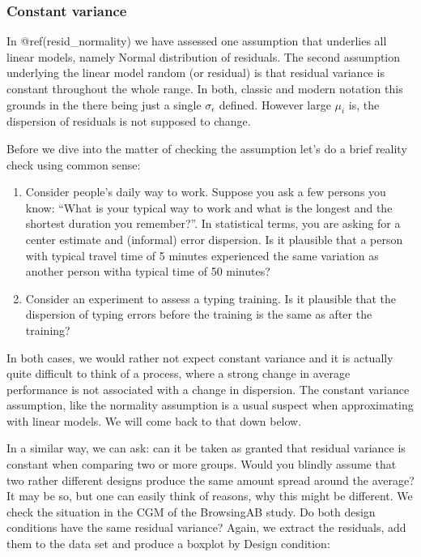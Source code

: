 \documentclass[]{svmono}
\theoremstyle{definition}
\theoremstyle{definition}
\theoremstyle{definition}
\theoremstyle{remark}
\begin{document}
\subsubsection{Constant variance}\label{resid_constant_variance}

In @ref(resid\_normality) we have assessed one assumption that underlies
all linear models, namely Normal distribution of residuals. The second
assumption underlying the linear model random (or residual) is that
residual variance is constant throughout the whole range. In both,
classic and modern notation this grounds in the there being just a
single \(\sigma_\epsilon\) defined. However large \(\mu_i\) is, the
dispersion of residuals is not supposed to change.

Before we dive into the matter of checking the assumption let's do a
brief reality check using common sense:

\begin{enumerate}
\def\labelenumi{\arabic{enumi}.}
\item
  Consider people's daily way to work. Suppose you ask a few persons you
  know: ``What is your typical way to work and what is the longest and
  the shortest duration you remember?''. In statistical terms, you are
  asking for a center estimate and (informal) error dispersion. Is it
  plausible that a person with typical travel time of 5 minutes
  experienced the same variation as another person witha typical time of
  50 minutes?
\item
  Consider an experiment to assess a typing training. Is it plausible
  that the dispersion of typing errors before the training is the same
  as after the training?
\end{enumerate}

In both cases, we would rather not expect constant variance and it is
actually quite difficult to think of a process, where a strong change in
average performance is not associated with a change in dispersion. The
constant variance assumption, like the normality assumption is a usual
suspect when approximating with linear models. We will come back to that
down below.

In a similar way, we can ask: can it be taken as granted that residual
variance is constant when comparing two or more groups. Would you
blindly assume that two rather different designs produce the same amount
spread around the average? It may be so, but one can easily think of
reasons, why this might be different. We check the situation in the CGM
of the BrowsingAB study. Do both design conditions have the same
residual variance? Again, we extract the residuals, add them to the data
set and produce a boxplot by Design condition:
\end{document}
